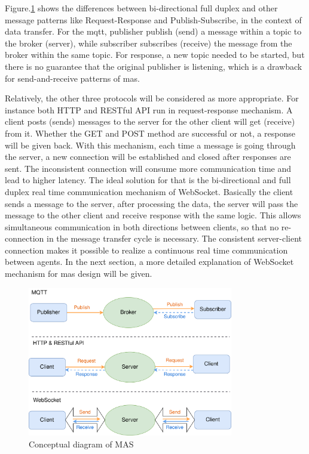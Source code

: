 Figure.\ref{fig: MsgConceptual} shows the differences between bi-directional full duplex and other message patterns like Request-Response and Publish-Subscribe, in the context of data transfer. 
For the \gls{mqtt}, publisher publish (send) a message within a topic to the broker (server), while subscriber subscribes (receive) the message from the broker within the same topic. 
For response, a new topic needed to be started, but there is no guarantee that the original publisher is listening, which is a drawback for send-and-receive patterns of \gls{mas}. 

Relatively, the other three protocols will be considered as more appropriate. 
For instance both HTTP and RESTful API run in request-response mechanism. 
A client posts (sends) messages to the server for the other client will get (receive) from it. 
Whether the GET and POST method are successful or not, a response will be given back. With this mechanism, each time a message is going through the server, a new connection will be established and closed after responses are sent. 
The inconsistent connection will consume more communication time and lead to higher latency. 
The ideal solution for that is the bi-directional and full duplex real time communication mechanism of WebSocket. 
Basically the client sends a message to the server, after processing the data, the server will pass the message to the other client and receive response with the same logic. This allows simultaneous communication in both directions between clients, so that no re-connection in the message transfer cycle is necessary. The consistent server-client connection makes it possible to realize a continuous real time communication between agents. In the next section, a more detailed explanation of WebSocket mechanism for \gls{mas} design will be given.

\begin{figure}[htb]
\includegraphics[width=0.8\textwidth]{figures/MessageConceptual.png}
\centering
\caption{Conceptual diagram of MAS\label{fig: MsgConceptual}}
\end{figure}

